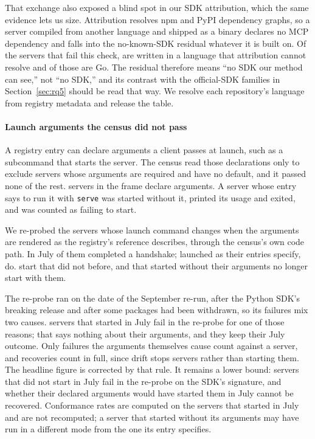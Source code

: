 That exchange also exposed a blind spot in our SDK attribution, which the same
evidence lets us size. Attribution resolves npm and PyPI dependency graphs, so a
server compiled from another language and shipped as a binary declares no MCP
dependency and falls into the \textsf{no-known-SDK} residual whatever it is built on.
Of the \NMalformedDies{} servers that fail this check, \NMalformedOpaque{} are written
in a language that attribution cannot resolve and \NMalformedGo{} of those are Go. The
residual therefore means ``no SDK our method can see,'' not ``no SDK,'' and its
contrast with the official-SDK families in Section~\ref{sec:rq5} should be read that
way. We resolve each repository's language from registry metadata and release the
table.

\paragraph{Launch arguments the census did not pass}
A registry entry can declare arguments a client passes at launch, such as a
subcommand that starts the server. The census read those declarations only to
exclude servers whose arguments are required and have no default, and it passed none
of the rest. \NArgsDeclared{} servers in the frame declare arguments. A server whose
entry says to run it with \texttt{serve} was started without it, printed its usage
and exited, and was counted as failing to start.

We re-probed the \NArgsReprobed{} servers whose launch command changes when the
arguments are rendered as the registry's reference describes, through the census's
own code path. In July \ArgsJulyRate{} of them completed a handshake; launched as
their entries specify, \ArgsReprobeRate{} do. \NArgsRecovered{} start that did not
before, and \NArgsNewlyFailed{} that started without their arguments no longer start
with them.

The re-probe ran on the date of the September re-run, after the Python SDK's breaking
release and after some packages had been withdrawn, so its failures mix two causes.
\NArgsDriftKept{} servers that started in July fail in the re-probe for one of those
reasons; that says nothing about their arguments, and they keep their July outcome.
Only failures the arguments themselves cause count against a server, and recoveries count in full, since drift stops servers rather than starting them. The
headline figure is corrected by that rule. It remains a lower bound: \NArgsDriftUnknown{} servers
that did not start in July fail in the re-probe on the SDK's signature, and whether
their declared arguments would have started them in July cannot be recovered. Conformance rates are computed on the
servers that started in July and are not recomputed; a server that started without
its arguments may have run in a different mode from the one its entry specifies.

